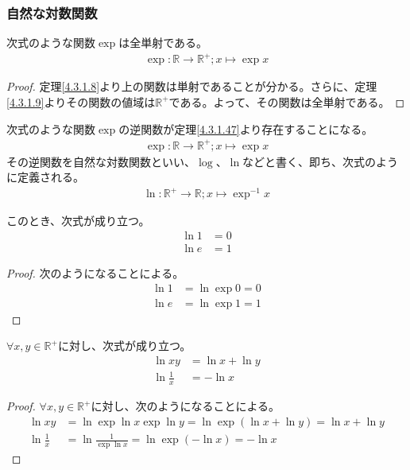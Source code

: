 \documentclass[dvipdfmx]{jsarticle}
\begin{document}
\subsubsection{自然な対数関数}%
\begin{thm}\label{4.3.1.47} 次式のような関数$\exp$は全単射である。
\begin{align*}
\exp:\mathbb{R} \rightarrow \mathbb{R}^{+};x \mapsto \exp x
\end{align*}
\end{thm}
\begin{proof} 定理\ref{4.3.1.8}より上の関数は単射であることが分かる。さらに、定理\ref{4.3.1.9}よりその関数の値域は$\mathbb{R}^{+}$である。よって、その関数は全単射である。
\end{proof}
\begin{dfn} 次式のような関数$\exp$の逆関数が定理\ref{4.3.1.47}より存在することになる。
\begin{align*}
\exp:\mathbb{R} \rightarrow \mathbb{R}^{+};x \mapsto \exp x
\end{align*}
その逆関数を自然な対数関数といい、$\log$、$\ln$などと書く、即ち、次式のように定義される。
\begin{align*}
\ln:\mathbb{R}^{+} \rightarrow \mathbb{R};x \mapsto \exp^{- 1}x
\end{align*}
\end{dfn}
\begin{thm}\label{4.3.1.48} このとき、次式が成り立つ。
\begin{align*}
\ln 1 &= 0\\
\ln e &= 1
\end{align*}
\end{thm}
\begin{proof} 次のようになることによる。
\begin{align*}
\ln 1 &= \ln{\exp 0} = 0\\
\ln e &= \ln{\exp 1} = 1
\end{align*}
\end{proof}
\begin{thm}\label{4.3.1.49} $\forall x,y \in \mathbb{R}^{+}$に対し、次式が成り立つ。
\begin{align*}
\ln{xy} &= \ln x + \ln y\\
\ln\frac{1}{x} &= - \ln x
\end{align*}
\end{thm}
\begin{proof}
$\forall x,y \in \mathbb{R}^{+}$に対し、次のようになることによる。
\begin{align*}
\ln{xy} &= \ln{\exp{\ln x}\exp{\ln y}} = \ln{\exp\left( \ln x + \ln y \right)} = \ln x + \ln y\\
\ln\frac{1}{x} &= \ln\frac{1}{\exp{\ln x}} = \ln{\exp\left( - \ln x \right)} = - \ln x
\end{align*}
\end{proof}
\end{document}
